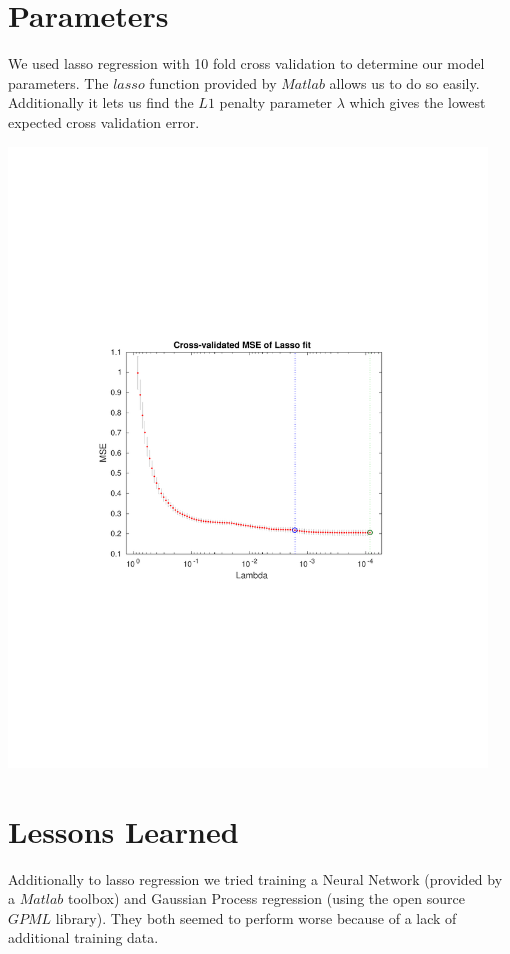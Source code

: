 \documentclass[a4paper, 11pt]{article}
\begin{document}
\section{Parameters}

We used lasso regression with 10 fold cross validation to determine our model parameters.
The $lasso$ function provided by $Matlab$ allows us to do so easily. Additionally it lets
us find the $L1$ penalty parameter $\lambda$ which gives the lowest expected cross validation error.

\begin{center}
\includegraphics[width=5in]{lasso_mse}
\end{center}

\section{Lessons Learned}

Additionally to lasso regression we tried training a Neural Network (provided by a $Matlab$ toolbox) and
Gaussian Process regression (using the open source $GPML$ library). They both
seemed to perform worse because of a lack of additional training data.
\end{document}
